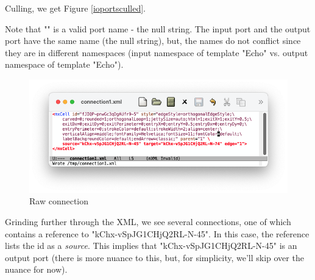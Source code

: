 \documentclass[10pt,anonymous,review]{acmart}
\begin{document}
Culling, we get Figure \ref{ioportsculled}.

\vspace{2\baselineskip}

\vspace{4\baselineskip}
Note that "" is a valid port name - the null string. The input port and the output port have the same name (the null string), but, the names do not conflict since they are in different namespaces (input namespace of template "Echo" vs. output namespace of template "Echo").

\vspace{1\baselineskip}

\begin{figure}
    \includegraphics[trim=1cm 1.9cm 1cm 1cm, clip, scale=0.35]{./media/connection1.png}
    \caption{Raw connection}
    \label{connection}
\end{figure}
Grinding further through the XML, we see several connections, one of which contains a reference to "kChx-vSpJG1CHjQ2RL-N-45". In this case, the reference lists the id as a \emph{source}. This implies that "kChx-vSpJG1CHjQ2RL-N-45" is an output port (there is more nuance to this, but, for simplicity, we'll skip over the nuance for now).

\vspace{2\baselineskip}
\end{document}
